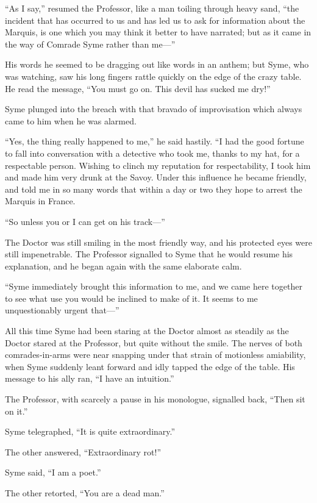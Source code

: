 “As I say,” resumed the Professor, like a man toiling through heavy sand, “the incident that has occurred to us and has led us to ask for information about the Marquis, is one which you may think it better to have narrated; but as it came in the way of Comrade Syme rather than me⁠—”

His words he seemed to be dragging out like words in an anthem; but Syme, who was watching, saw his long fingers rattle quickly on the edge of the crazy table. He read the message, “You must go on. This devil has sucked me dry!”

Syme plunged into the breach with that bravado of improvisation which always came to him when he was alarmed.

“Yes, the thing really happened to me,” he said hastily. “I had the good fortune to fall into conversation with a detective who took me, thanks to my hat, for a respectable person. Wishing to clinch my reputation for respectability, I took him and made him very drunk at the Savoy. Under this influence he became friendly, and told me in so many words that within a day or two they hope to arrest the Marquis in France.

“So unless you or I can get on his track⁠—”

The Doctor was still smiling in the most friendly way, and his protected eyes were still impenetrable. The Professor signalled to Syme that he would resume his explanation, and he began again with the same elaborate calm.

“Syme immediately brought this information to me, and we came here together to see what use you would be inclined to make of it. It seems to me unquestionably urgent that⁠—”

All this time Syme had been staring at the Doctor almost as steadily as the Doctor stared at the Professor, but quite without the smile. The nerves of both comrades-in-arms were near snapping under that strain of motionless amiability, when Syme suddenly leant forward and idly tapped the edge of the table. His message to his ally ran, “I have an intuition.”

The Professor, with scarcely a pause in his monologue, signalled back, “Then sit on it.”

Syme telegraphed, “It is quite extraordinary.”

The other answered, “Extraordinary rot!”

Syme said, “I am a poet.”

The other retorted, “You are a dead man.”

